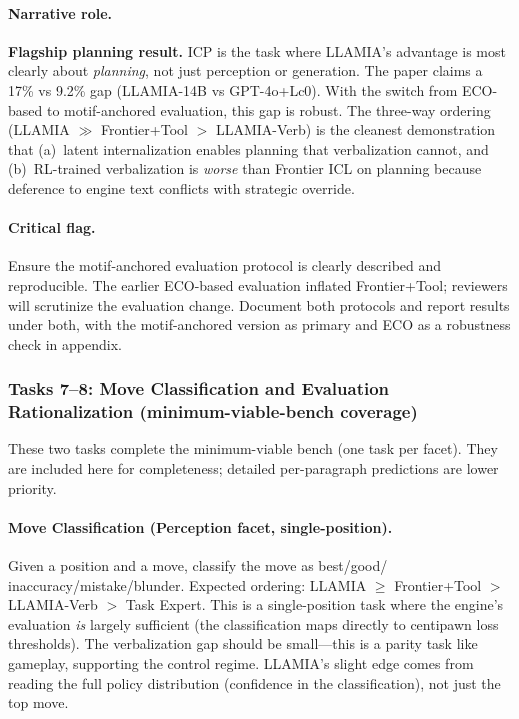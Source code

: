 \paragraph{Narrative role.}
\textbf{Flagship planning result.} ICP is the task where LLAMIA's
advantage is most clearly about \emph{planning}, not just perception
or generation. The paper claims a 17\% vs 9.2\% gap (LLAMIA-14B vs
GPT-4o+Lc0). With the switch from ECO-based to motif-anchored
evaluation, this gap is robust. The three-way ordering
(LLAMIA $\gg$ Frontier+Tool $>$ LLAMIA-Verb) is the cleanest
demonstration that (a)~latent internalization enables planning that
verbalization cannot, and (b)~RL-trained verbalization is
\emph{worse} than Frontier ICL on planning because deference to
engine text conflicts with strategic override.

\paragraph{Critical flag.}
Ensure the motif-anchored evaluation protocol is clearly described
and reproducible. The earlier ECO-based evaluation inflated
Frontier+Tool; reviewers will scrutinize the evaluation change.
Document both protocols and report results under both, with the
motif-anchored version as primary and ECO as a robustness check in
appendix.

\subsubsection*{Tasks 7--8: Move Classification and Evaluation
Rationalization (minimum-viable-bench coverage)}
\label{sec:perf_mincov}

These two tasks complete the minimum-viable bench (one task per
facet). They are included here for completeness; detailed
per-paragraph predictions are lower priority.

\paragraph{Move Classification (Perception facet, single-position).}
Given a position and a move, classify the move as best/good/
inaccuracy/mistake/blunder. Expected ordering: LLAMIA $\geq$
Frontier+Tool $>$ LLAMIA-Verb $>$ Task Expert. This is a
single-position task where the engine's evaluation \emph{is}
largely sufficient (the classification maps directly to centipawn
loss thresholds). The verbalization gap should be small---this is a
parity task like gameplay, supporting the control regime. LLAMIA's
slight edge comes from reading the full policy distribution
(confidence in the classification), not just the top move.


